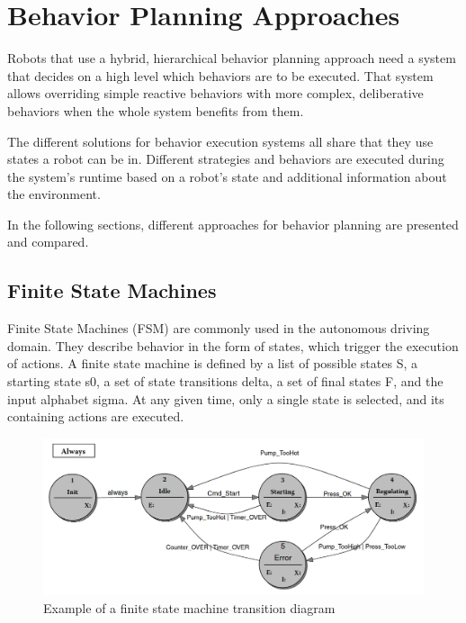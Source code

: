 \section{Behavior Planning Approaches}

Robots that use a hybrid, hierarchical behavior planning approach need a system that decides on a high level which behaviors are to be executed. That system allows overriding simple reactive behaviors with more complex, deliberative behaviors when the whole system benefits from them. 

The different solutions for behavior execution systems all share that they use states a robot can be in. Different strategies and behaviors are executed during the system's runtime based on a robot's state and additional information about the environment. 
 
In the following sections, different approaches for behavior planning are presented and compared.

\subsection{Finite State Machines}

Finite State Machines (FSM) are commonly used in the autonomous driving domain. They describe behavior in the form of states, which trigger the execution of actions. A finite state machine is defined by a list of possible states S, a starting state s0, a set of state transitions delta, a set of final states F, and the input alphabet sigma. At any given time, only a single state is selected, and its containing actions are executed. 

\begin{figure}[ht]
	\includegraphics[width=1.0\textwidth]{images/fsm.png} 
	\caption{Example of a finite state machine transition diagram \cite{wagner2006}}
	\label{fig:fsm}
\end{figure}

